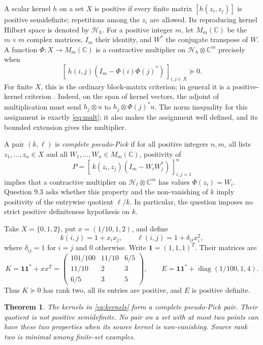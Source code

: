 \documentclass[11pt]{article}
\newtheorem{theorem}{Theorem}
\newcommand{\psd}{\succeq0}
\newcommand{\HH}{\mathcal H}
\newcommand{\diag}{\operatorname{diag}}
\begin{document}
A scalar kernel $h$ on a set $X$ is positive if every finite matrix
$[h(z_i,z_j)]$ is positive semidefinite; repetitions among the $z_i$ are
allowed. Its reproducing kernel Hilbert space is denoted by $\HH_h$.
For a positive integer $m$, let $M_m(\mathbb C)$ be the $m\times m$
complex matrices, $I_m$ their identity, and $W^*$ the conjugate transpose
of $W$. A function $\Phi:X\to M_m(\mathbb C)$ is a contractive
multiplier on $\HH_h\otimes\mathbb C^m$ precisely when
\begin{equation}\label{eq:mult}
  [\,h(i,j)(I_m-\Phi(i)\Phi(j)^*)\,]_{i,j\in X}\psd.
\end{equation}
For finite $X$, this is the ordinary block-matrix criterion; in general
it is a positive-kernel criterion \cite[Section 3, p.~15]{LMT}.
Indeed, on the span of kernel vectors, the adjoint of multiplication must
send $h_j\otimes u$ to $h_j\otimes\Phi(j)^*u$.
The norm inequality for this assignment is exactly \eqref{eq:mult}; it
also makes the assignment well defined, and its bounded extension gives
the multiplier.

A pair $(k,\ell)$ is \emph{complete pseudo-Pick} if for all positive
integers $n,m$, all lists $z_1,\ldots,z_n\in X$ and all
$W_1,\ldots,W_n\in M_m(\mathbb C)$, positivity of
\begin{equation}\label{eq:pick}
  P=[\,k(z_i,z_j)(I_m-W_iW_j^*)\,]_{i,j=1}^n
\end{equation}
implies that a contractive multiplier on $\HH_\ell\otimes\mathbb C^m$
has values $\Phi(z_i)=W_i$. Question 9.3 asks whether this property and
the non-vanishing of $k$ imply positivity of the entrywise quotient
$\ell/k$. In particular, the question imposes no strict positive
definiteness hypothesis on $k$.

Take $X=\{0,1,2\}$, put $x=(1/10,1,2)$, and define
\begin{equation}\label{eq:kernels}
 k(i,j)=1+x_i x_j,\qquad
 \ell(i,j)=1+\delta_{ij}x_i^2,
\end{equation}
where $\delta_{ij}=1$ for $i=j$ and $0$ otherwise. Write
$\mathbf1=(1,1,1)^T$. Their matrices are
\[
 K=\mathbf1\mathbf1^*+xx^T
 =\begin{pmatrix}101/100&11/10&6/5\\11/10&2&3\\6/5&3&5\end{pmatrix},
 \qquad
 E=\mathbf1\mathbf1^*+\diag(1/100,1,4).
\]
Thus $K\psd$ has rank two, all its entries are positive, and $E$ is
positive definite.

\begin{theorem}\label{thm:main}
The kernels in \eqref{eq:kernels} form a complete pseudo-Pick pair.
Their quotient is not positive semidefinite. No pair on a set with at
most two points can have these two properties when its source kernel
is non-vanishing. Source rank two is minimal among finite-set examples.
\end{theorem}
\end{document}
